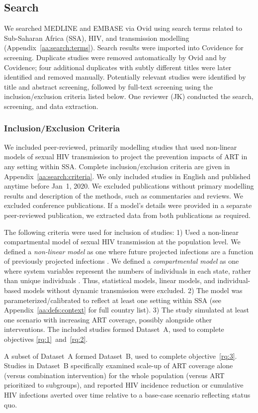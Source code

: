 \subsection{Search}
\label{ss:meth:search}
We searched MEDLINE and EMBASE via Ovid
using search terms related to Sub-Saharan Africa (SSA), HIV, and transmission modelling
(Appendix~\ref{aa:search:terms}).
Search results were imported into Covidence \cite{Covidence} for screening.
Duplicate studies were removed automatically by Ovid and by Covidence;
four additional duplicates with subtly different titles were later identified and removed manually.
Potentially relevant studies were identified by title and abstract screening, followed 
by full-text screening using the inclusion/exclusion criteria listed below. 
One reviewer (JK) conducted the search, screening, and data extraction.
\subsubsection{Inclusion/Exclusion Criteria}
\label{sss:meth:criteria}
We included peer-reviewed, primarily modelling studies that used non-linear models of sexual HIV transmission
to project the prevention impacts of ART in any setting within SSA.
Complete inclusion/exclusion criteria are given in Appendix~\ref{aa:search:criteria}.
We only included studies in English and published anytime before Jan~1, 2020.
We excluded publications without primary modelling results and description of the methods,
such as commentaries and reviews.
We excluded conference publications.
If a model's details were provided in a separate peer-reviewed publication,
we extracted data from both publications as required.
\par
The following criteria were used for inclusion of studies:
1) Used a non-linear compartmental model of
sexual HIV transmission at the population level.
We defined a \emph{non-linear model} as one where
future projected infections are a function of previously projected infections \cite{Garnett2011}.
We defined a \emph{compartmental model} as one where
system variables represent the numbers of individuals in each state,
rather than unique individuals \cite{Garnett2011}.
Thus, statistical models, linear models, and individual-based models without dynamic transmission were excluded.
2) The model was parameterized/calibrated to reflect at least one setting within SSA
(see Appendix~\ref{aa:defs:context} for full country list).
3) The study simulated at least one scenario with increasing ART coverage,
possibly alongside other interventions.
The included studies formed Dataset~A,
used to complete objectives \ref{rq:1}~and~\ref{rq:2}.
\par
A subset of Dataset~A formed Dataset~B,
used to complete objective~\ref{rq:3}.
Studies in Dataset~B specifically examined
scale-up of ART coverage alone (versus combination intervention)
for the whole population (versus ART prioritized to subgroups),
and reported HIV incidence reduction or cumulative HIV infections averted over time 
relative to a base-case scenario reflecting status quo.
